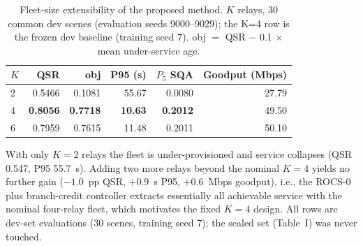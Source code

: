 \begin{table}[t]
\centering
\caption{Fleet-size extensibility of the proposed method. $K$ relays, 30 common dev scenes (evaluation seeds 9000--9029); the K=4 row is the frozen dev baseline (training seed 7). obj $=$ QSR $-$ 0.1 $\times$ mean under-service age.}
\label{tab:kscan}
\begin{tabular}{@{}lrrrrr@{}}
\toprule
$K$ & QSR & obj & P95 (s) & $P_5$ SQA & Goodput (Mbps) \\
\midrule
2 & 0.5466 & 0.1081 & 55.67 & 0.0080 & 27.79 \\
4 & \textbf{0.8056} & \textbf{0.7718} & \textbf{10.63} & \textbf{0.2012} & 49.50 \\
6 & 0.7959 & 0.7615 & 11.48 & 0.2011 & 50.10 \\
\bottomrule
\end{tabular}
\begin{flushleft}\footnotesize
With only $K=2$ relays the fleet is under-provisioned and service collapses (QSR 0.547, P95 55.7~s). Adding two more relays beyond the nominal $K=4$ yields no further gain ($-1.0$~pp QSR, $+0.9$~s P95, $+0.6$~Mbps goodput), i.e., the ROCS-0 plus branch-credit controller extracts essentially all achievable service with the nominal four-relay fleet, which motivates the fixed $K=4$ design. All rows are dev-set evaluations (30 scenes, training seed 7); the sealed set (Table~I) was never touched.
\end{flushleft}
\end{table}

